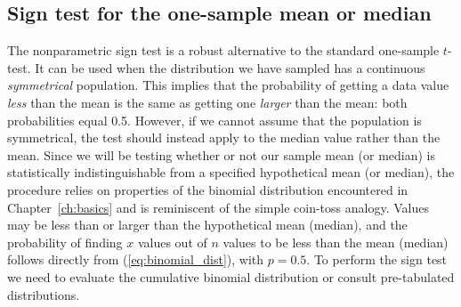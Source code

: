 \subsection{Sign test for the one-sample mean or median}

The nonparametric sign test is a robust alternative to the standard one-sample $t$-test.
It can be used when the distribution we have sampled has a continuous \emph{symmetrical} population.
This implies that the probability of getting a data value \emph{less} than the mean is the same as
getting one \emph{larger} than the mean: both probabilities equal 0.5.  However, if we cannot assume
that the population is symmetrical, the test should instead apply to the median value rather than the mean.
Since we will be testing whether or not our sample mean (or median) is statistically indistinguishable
from a specified hypothetical mean (or median), the procedure relies on properties of the binomial
distribution encountered in Chapter~\ref{ch:basics} and is reminiscent of the simple coin-toss analogy.
Values may be less than or larger than the hypothetical mean (median), and the probability of finding
$x$ values out of $n$ values to be less than the mean (median) follows directly from (\ref{eq:binomial_dist}), with $p = 0.5$.
To perform the sign test we need to evaluate the cumulative binomial distribution or consult pre-tabulated distributions.
